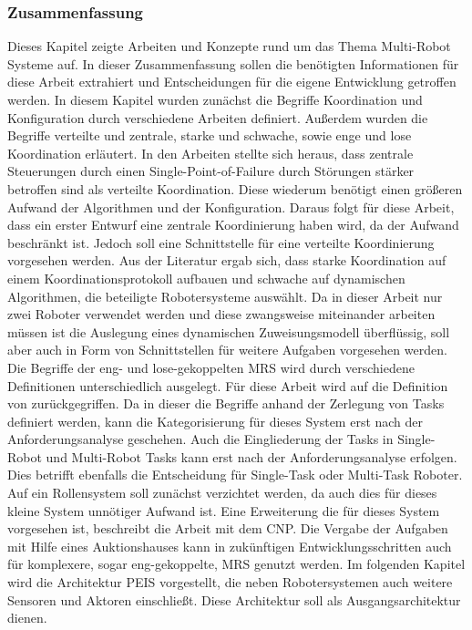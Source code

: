 \subsubsection{Zusammenfassung}
Dieses Kapitel zeigte Arbeiten und Konzepte rund um das Thema Multi-Robot Systeme auf. In dieser Zusammenfassung sollen die benötigten Informationen für diese Arbeit extrahiert und Entscheidungen für die eigene Entwicklung getroffen werden. In diesem Kapitel wurden zunächst die Begriffe Koordination und Konfiguration durch verschiedene Arbeiten definiert. Außerdem wurden die Begriffe verteilte und zentrale, starke und schwache, sowie enge und lose Koordination erläutert. In den Arbeiten stellte sich heraus, dass zentrale Steuerungen durch einen Single-Point-of-Failure durch Störungen stärker betroffen sind als verteilte Koordination. Diese wiederum benötigt einen größeren Aufwand der Algorithmen und der Konfiguration. Daraus folgt für diese Arbeit, dass ein erster Entwurf eine zentrale Koordinierung haben wird, da der Aufwand beschränkt ist. Jedoch soll eine Schnittstelle für eine verteilte Koordinierung vorgesehen werden. Aus der Literatur ergab sich, dass starke Koordination auf einem Koordinationsprotokoll aufbauen und schwache auf dynamischen Algorithmen, die beteiligte Robotersysteme auswählt. Da in dieser Arbeit nur zwei Roboter verwendet werden und diese zwangsweise miteinander arbeiten müssen ist die Auslegung eines dynamischen Zuweisungsmodell überflüssig, soll aber auch in Form von Schnittstellen für weitere Aufgaben vorgesehen werden. Die Begriffe der eng- und lose-gekoppelten MRS wird durch verschiedene Definitionen unterschiedlich ausgelegt. Für diese Arbeit wird auf die Definition von \cite{kalra2004hoplites} zurückgegriffen. Da in dieser die Begriffe anhand der Zerlegung von Tasks definiert werden, kann die Kategorisierung für dieses System erst nach der Anforderungsanalyse geschehen. Auch die Eingliederung der Tasks in Single-Robot und Multi-Robot Tasks kann erst nach der Anforderungsanalyse erfolgen. Dies betrifft ebenfalls die Entscheidung für Single-Task oder Multi-Task Roboter. Auf ein Rollensystem soll zunächst verzichtet werden, da auch dies für dieses kleine System unnötiger Aufwand ist. Eine Erweiterung die für dieses System vorgesehen ist, beschreibt die Arbeit \cite{davis2003negotiation} mit dem CNP. Die Vergabe der Aufgaben mit Hilfe eines Auktionshauses kann in zukünftigen Entwicklungsschritten auch für komplexere, sogar eng-gekoppelte, MRS genutzt werden. Im folgenden Kapitel wird die Architektur PEIS vorgestellt, die neben Robotersystemen auch weitere Sensoren und Aktoren einschließt. Diese Architektur soll als Ausgangsarchitektur dienen.